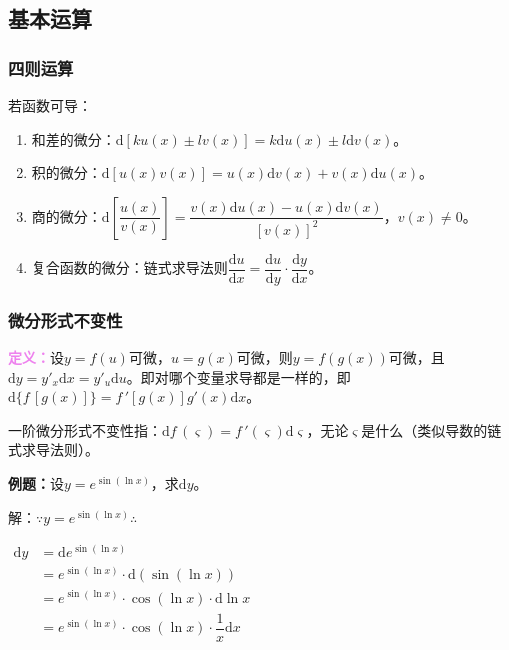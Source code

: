 \documentclass[UTF8, 12pt]{ctexart}
\begin{document}
        \subsection{基本运算}

        \subsubsection{四则运算}

        若函数可导：

        \begin{enumerate}
            \item 和差的微分：$\textrm{d}[ku(x)\pm lv(x)]=k\textrm{d}u(x)\pm l\textrm{d}v(x)$。
            \item 积的微分：$\textrm{d}[u(x)v(x)]=u(x)\textrm{d}v(x)+v(x)\textrm{d}u(x)$。
            \item 商的微分：$\textrm{d}\left[\dfrac{u(x)}{v(x)}\right]=\dfrac{v(x)\textrm{d}u(x)-u(x)\textrm{d}v(x)}{[v(x)]^2}$，$v(x)\neq 0$。
            \item 复合函数的微分：链式求导法则$\dfrac{\textrm{d}u}{\textrm{d}x}=\dfrac{\textrm{d}u}{\textrm{d}y}\cdot\dfrac{\textrm{d}y}{\textrm{d}x}$。
        \end{enumerate}

        \subsubsection{微分形式不变性}

        \textcolor{violet}{\textbf{定义：}}设$y=f(u)$可微，$u=g(x)$可微，则$y=f(g(x))$可微，且$\textrm{d}y=y'_{x}\textrm{d}x=y'_{u}\textrm{d}u$。即对哪个变量求导都是一样的，即$\textrm{d}\{f\,[g(x)]\}=f\,'[g(x)]g'(x)\textrm{d}x$。

        一阶微分形式不变性指：$\textrm{d}f\,(\varsigma)=f\,'(\varsigma)\textrm{d}\varsigma$，无论$\varsigma$是什么（类似导数的链式求导法则）。

        \textbf{例题：}设$y=e^{\sin(\ln x)}$，求$\textrm{d}y$。

        解：$\because y=e^{\sin(\ln x)} \therefore$

        $
        \begin{aligned}
            \textrm{d}y &=\textrm{d}e^{\sin(\ln x)} \\
            & =e^{\sin(\ln x)}\cdot\textrm{d}(\sin(\ln x)) \\
            & =e^{\sin(\ln x)}\cdot\cos(\ln x)\cdot\textrm{d}\ln x \\
            & =e^{\sin(\ln x)}\cdot\cos(\ln x)\cdot\dfrac{1}{x}\textrm{d}x
        \end{aligned}
        $
\end{document}
